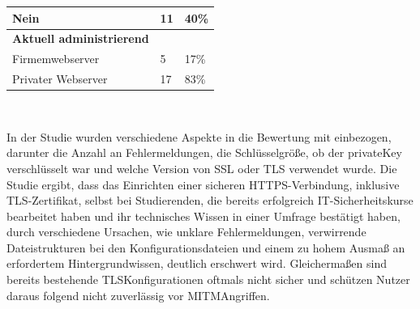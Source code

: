 \begin{table}[H]
{\begin{tabular}{lll}
            Nein                                                      & 11     & 40\%    \\ \hline
            \textbf{Aktuell administrierend}                          &        &         \\
            Firmemwebserver                                           & 5      & 17\%    \\
            Privater Webserver                                        & 17     & 83\%    \\ \hline
        \end{tabular}%
    }
\end{table}\ 

In der Studie wurden verschiedene Aspekte in die Bewertung mit einbezogen, darunter die Anzahl an Fehlermeldungen, die Schlüsselgröße, ob der \gls{privateKey} verschlüsselt war und welche Version von \ac{SSL} oder \ac{TLS} verwendet wurde.
Die Studie ergibt, dass das Einrichten einer sicheren \ac{HTTPS}-Verbindung, inklusive \ac{TLS}-Zertifikat, selbst bei Studierenden, die bereits erfolgreich IT-Sicherheitskurse bearbeitet haben und ihr technisches Wissen in einer Umfrage bestätigt haben, durch verschiedene Ursachen, wie \zb unklare Fehlermeldungen, verwirrende Dateistrukturen bei den Konfigurationsdateien und einem zu hohem Ausmaß an erfordertem Hintergrundwissen, deutlich erschwert wird.\autocite[\vglf][]{usabilityHTTPS:2017} Gleichermaßen sind bereits bestehende \ac{TLS}\nonbreakdash Konfigurationen oftmals nicht sicher und schützen Nutzer daraus folgend nicht zuverlässig vor \ac{MITM}\nonbreakdash Angriffen\autocite[\vglf][]{usabilityHTTPS:2017}.